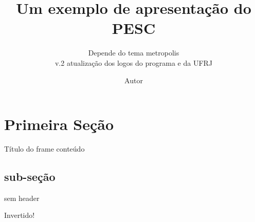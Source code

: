 \documentclass[aspectratio=169]{beamer}
\title[exemplo de apresentação]{Um exemplo de apresentação do PESC}
\subtitle{Depende do tema metropolis \\ v.2 atualização dos logos do programa e da UFRJ}
\author{Autor}
\begin{document}
    \maketitle
	\section{Primeira Seção}
	
\begin{frame}{Título do frame}
	conteúdo
\end{frame}

\subsection{sub-seção}
	
\begin{frame}[plain]
 sem header
\end{frame}

\begin{frame}[standout]
	Invertido!
\end{frame}
\end{document}
